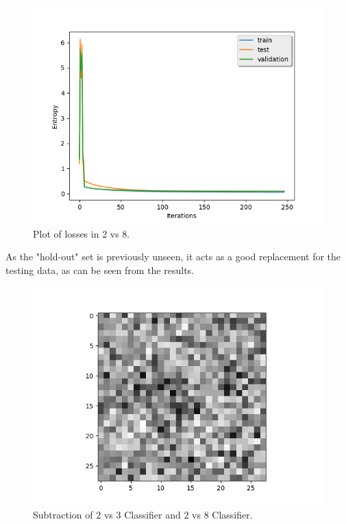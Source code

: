 \documentclass{article} %
\begin{document}
\begin{figure}[h]
\begin{center}
\includegraphics[width=0.8\linewidth]{plt_2vs8_losses.png}
\end{center}
\caption{Plot of losses in 2 vs 8.}
\end{figure}
As the "hold-out" set is previously unseen, it acts as a good replacement for the testing data, as can be seen from the results.
\begin{figure}[h]
\begin{center}
\includegraphics[width=0.8\linewidth]{2vs3-2vs8.png}
\end{center}
\caption{Subtraction of 2 vs 3 Classifier and 2 vs 8 Classifier.}
\end{figure}
\end{document}
